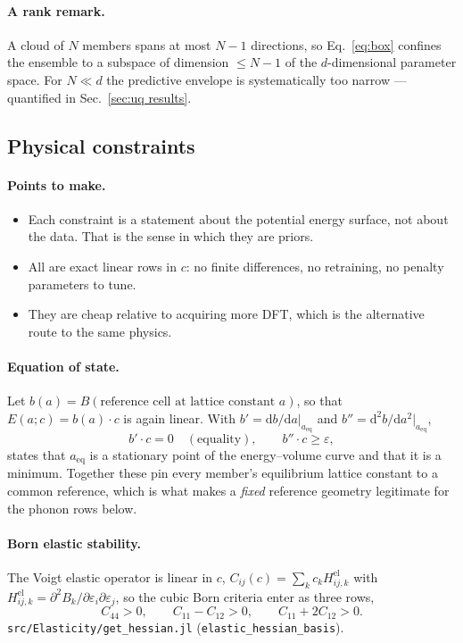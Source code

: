 \documentclass{article}
\newcommand{\code}[1]{\texttt{\small #1}}
\begin{document}
\paragraph{A rank remark.}
A cloud of $N$ members spans at most $N-1$ directions, so Eq.~\eqref{eq:box}
confines the ensemble to a subspace of dimension $\le N-1$ of the
$d$-dimensional parameter space. For $N \ll d$ the predictive envelope is
systematically too narrow --- quantified in Sec.~\ref{sec:uq results}.

\subsection{Physical constraints}
\label{sec:constraints}

\paragraph{Points to make.}
\begin{itemize}
  \item Each constraint is a statement about the potential energy surface, not about the data. That is the sense in which they are priors.
  \item All are exact linear rows in $c$: no finite differences, no retraining, no penalty parameters to tune.
  \item They are cheap relative to acquiring more DFT, which is the alternative route to the same physics.
\end{itemize}

\paragraph{Equation of state.}
Let $b(a) = B(\text{reference cell at lattice constant } a)$, so that
$E(a;c) = b(a)\cdot c$ is again linear. With
$b' = \mathrm{d}b/\mathrm{d}a|_{a_{\mathrm{eq}}}$ and
$b'' = \mathrm{d}^{2}b/\mathrm{d}a^{2}|_{a_{\mathrm{eq}}}$,
\begin{equation}
  b'\cdot c = 0 \quad(\text{equality}), \qquad b''\cdot c \ge \varepsilon ,
  \label{eq:eos}
\end{equation}
states that $a_{\mathrm{eq}}$ is a stationary point of the energy--volume curve
and that it is a minimum. Together these pin every member's equilibrium lattice
constant to a common reference, which is what makes a \emph{fixed} reference
geometry legitimate for the phonon rows below.

\paragraph{Born elastic stability.}
The Voigt elastic operator is linear in $c$,
$C_{ij}(c) = \sum_k c_k H^{\mathrm{el}}_{ij,k}$ with
$H^{\mathrm{el}}_{ij,k} = \partial^{2}B_k/\partial\varepsilon_i\partial\varepsilon_j$,
so the cubic Born criteria enter as three rows,
\begin{equation}
  C_{44} > 0, \qquad C_{11}-C_{12} > 0, \qquad C_{11}+2C_{12} > 0 .
  \label{eq:born}
\end{equation}
\code{src/Elasticity/get\_hessian.jl} (\code{elastic\_hessian\_basis}).
\end{document}
